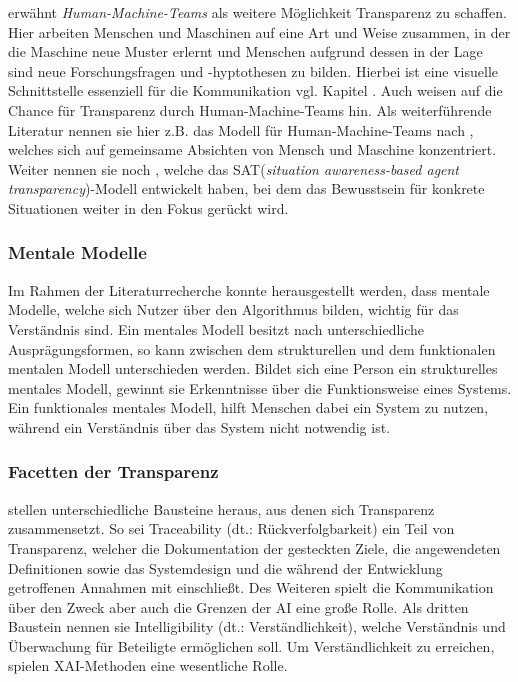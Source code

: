 \cite{wenskovitch2021beyond} erwähnt \emph{Human-Machine-Teams} als weitere Möglichkeit Transparenz zu schaffen. Hier arbeiten Menschen und Maschinen auf eine Art und Weise zusammen, in der die Maschine neue Muster erlernt und Menschen aufgrund dessen in der Lage sind neue Forschungsfragen und -hyptothesen zu bilden. Hierbei ist eine visuelle Schnittstelle essenziell für die Kommunikation vgl. Kapitel . 
Auch \cite{westin2020building} weisen auf die Chance für Transparenz durch Human-Machine-Teams hin. Als weiterführende Literatur nennen sie hier z.B. das Modell für Human-Machine-Teams nach \cite{lyons2013being}, welches sich auf gemeinsame Absichten von Mensch und Maschine konzentriert. Weiter nennen sie noch \cite{chen2014situation}, welche das SAT(\emph{situation awareness-based agent transparency})-Modell entwickelt haben, bei dem das Bewusstsein für konkrete Situationen weiter in den Fokus gerückt wird.

\subsubsection{Mentale Modelle}
Im Rahmen der Literaturrecherche konnte herausgestellt werden, dass mentale Modelle, welche sich Nutzer über den Algorithmus bilden, wichtig für das Verständnis sind.
Ein mentales Modell besitzt nach \cite{kulesza2013too} unterschiedliche Ausprägungsformen, so kann zwischen dem strukturellen und dem funktionalen mentalen Modell unterschieden werden. Bildet sich eine Person ein strukturelles mentales Modell, gewinnt sie Erkenntnisse über die Funktionsweise eines Systems. Ein funktionales mentales Modell, hilft Menschen dabei ein System zu nutzen, während ein Verständnis über das System nicht notwendig ist.

\subsubsection{Facetten der Transparenz} 
\cite{vaughan2020human} stellen unterschiedliche Bausteine heraus, aus denen sich Transparenz zusammensetzt. So sei Traceability (dt.: Rückverfolgbarkeit) ein Teil von Transparenz, welcher die Dokumentation der gesteckten Ziele, die angewendeten Definitionen sowie das Systemdesign und die während der Entwicklung getroffenen Annahmen mit einschließt. Des Weiteren spielt die Kommunikation über den Zweck aber auch die Grenzen der AI eine große Rolle. Als dritten Baustein nennen sie Intelligibility (dt.: Verständlichkeit), welche Verständnis und Überwachung für Beteiligte ermöglichen soll. Um Verständlichkeit zu erreichen, spielen XAI-Methoden eine wesentliche Rolle.

